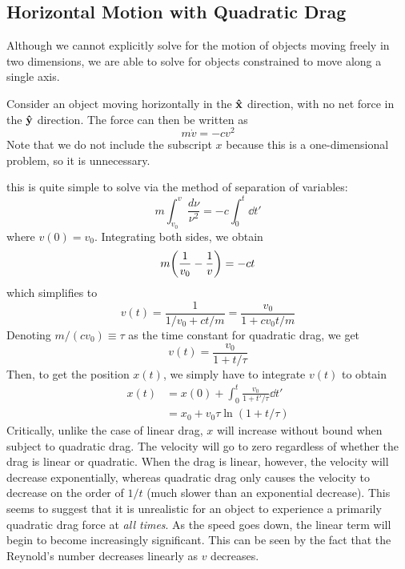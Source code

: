 \subsection*{Horizontal Motion with Quadratic Drag}
Although we cannot explicitly solve for the motion of objects moving freely in two dimensions, we are able to solve for objects constrained to move along a single axis.

Consider an object moving horizontally in the $\mathbf{\hat{x}}$ direction, with no net force in the $\mathbf{\hat{y}}$ direction. The force can then be written as
\[ m\dot v = -cv^2 \]
Note that we do not include the subscript $x$ because this is a one-dimensional problem, so it is unnecessary.

this is quite simple to solve via the method of separation of variables:
\[ m\int_{v_0}^{v} \frac{d\nu }{\nu^2} = -c\int_0^t \dd t'\]
where $v(0) = v_0$. Integrating both sides, we obtain
\[ m\pqty{\frac{1}{v_0} - \frac{1}{v}} = -ct \]
which simplifies to
\[ v(t) = \frac{1}{1/v_0 + ct/m} = \frac{v_0}{1+cv_0t/m}\]
Denoting $m/(cv_0) \equiv \tau$ as the time constant for quadratic drag, we get
\[ v(t) = \frac{v_0}{1+t/\tau} \]
Then, to get the position $x(t)$, we simply have to integrate $v(t)$ to obtain
\begin{align*}
    x(t) &= x(0) + \int_0^t \frac{v_0}{1+t'/\tau}\dd t' \\
    &= x_0 + v_0\tau \ln(1 + t/\tau) 
\end{align*}
Critically, unlike the case of linear drag, $x$ will increase without bound when subject to quadratic drag. The velocity will go to zero regardless of whether the drag is linear or quadratic. When the drag is linear, however, the velocity will decrease exponentially, whereas quadratic drag only causes the velocity to decrease on the order of $1/t$ (much slower than an exponential decrease). This seems to suggest that it is unrealistic for an object to experience a primarily quadratic drag force at \textit{all times}. As the speed goes down, the linear term will begin to become increasingly significant. This can be seen by the fact that the Reynold's number decreases linearly as $v$ decreases.
